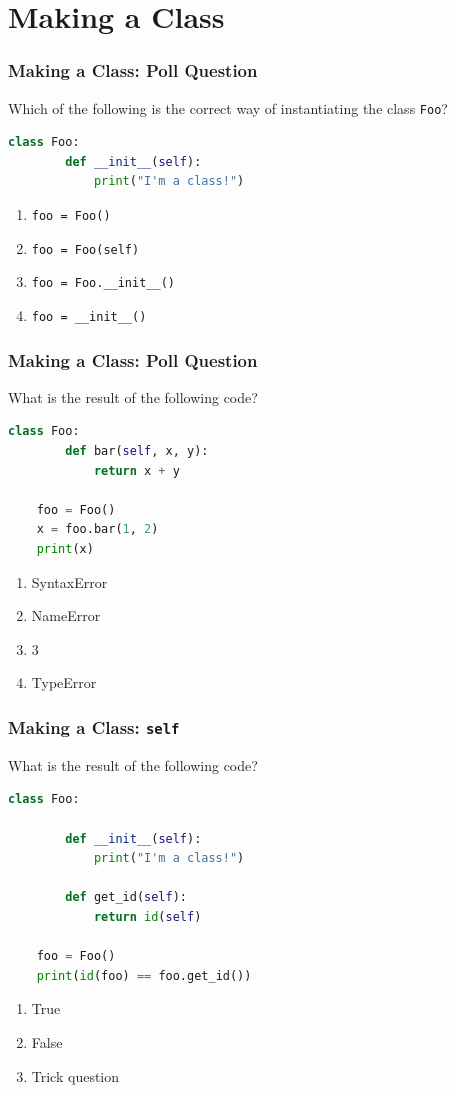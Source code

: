\documentclass{beamer}
\begin{document}
\section{Making a Class}

%
%
\begin{frame}[fragile]
    \frametitle{Making a Class: Poll Question}
    Which of the following is the correct way of instantiating the class \lstinline|Foo|?
    \begin{lstlisting}[language=Python, autogobble]
    class Foo:
        def __init__(self):
            print("I'm a class!")
    \end{lstlisting}
    \vfill
    \begin{enumerate}[A]
        \item \lstinline|foo = Foo()|
        \item \lstinline|foo = Foo(self)|
        \item \lstinline|foo = Foo.__init__()|
        \item \lstinline|foo = __init__()|
    \end{enumerate}
\end{frame}

%
%
\begin{frame}[fragile]
    \frametitle{Making a Class: Poll Question}
    What is the result of the following code?
    \begin{lstlisting}[language=Python, autogobble]
    class Foo:
        def bar(self, x, y):
            return x + y

    foo = Foo()
    x = foo.bar(1, 2)
    print(x)
    \end{lstlisting}
    \vfill
    \begin{enumerate}[A]
        \item SyntaxError
        \item NameError
        \item 3
        \item TypeError
    \end{enumerate}
\end{frame}


%
%
\begin{frame}[fragile]
    \frametitle{Making a Class: \lstinline|self|}
    What is the result of the following code?
    \begin{lstlisting}[language=Python, autogobble]
    class Foo:

        def __init__(self):
            print("I'm a class!")

        def get_id(self):
            return id(self)

    foo = Foo()
    print(id(foo) == foo.get_id())
    \end{lstlisting}
    \vfill
    \begin{enumerate}[A]
        \item True
        \item False
        \item Trick question
    \end{enumerate}
\end{frame}
\end{document}
